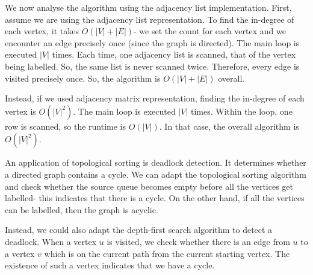 \documentclass[a4paper, openany]{memoir}
\begin{document}
We now analyse the algorithm using the adjacency list implementation. First, assume we are using the adjacency list representation. To find the in-degree of each vertex, it takes $O(|V|+|E|)$- we set the count for each vertex and we encounter an edge precisely once (since the graph is directed). The main loop is executed $|V|$ times. Each time, one adjacency list is scanned, that of the vertex being labelled. So, the same list is never scanned twice. Therefore, every edge is visited precisely once. So, the algorithm is $O(|V| + |E|)$ overall.

Instead, if we used adjacency matrix representation, finding the in-degree of each vertex is $O(|V|^2)$. The main loop is executed $|V|$ times. Within the loop, one row is scanned, so the runtime is $O(|V|)$. In that case, the overall algorithm is $O(|V|^2)$.

An application of topological sorting is deadlock detection. It determines whether a directed graph contains a cycle. We can adapt the topological sorting algorithm and check whether the source queue becomes empty before all the vertices get labelled- this indicates that there is a cycle. On the other hand, if all the vertices can be labelled, then the graph is acyclic.

Instead, we could also adapt the depth-first search algorithm to detect a deadlock. When a vertex $u$ is visited, we check whether there is an edge from $u$ to a vertex $v$ which is on the current path from the current starting vertex. The existence of such a vertex indicates that we have a cycle.
\end{document}
